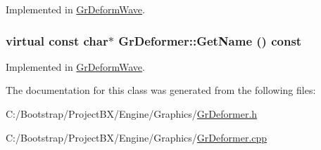 Implemented in \hyperlink{class_gr_deform_wave_8beb11978116306cb10394563b241eb9}{GrDeformWave}.\hypertarget{class_gr_deformer_c4b54b927f3b2febd0552bc610fe5b41}{
\subsubsection[{GetName}]{\setlength{\rightskip}{0pt plus 5cm}virtual const char$\ast$ GrDeformer::GetName () const}}
\label{class_gr_deformer_c4b54b927f3b2febd0552bc610fe5b41}




Implemented in \hyperlink{class_gr_deform_wave_ba87858cdf1442419942004c98691ee4}{GrDeformWave}.

The documentation for this class was generated from the following files:\begin{CompactItemize}
\item 
C:/Bootstrap/ProjectBX/Engine/Graphics/\hyperlink{_gr_deformer_8h}{GrDeformer.h}\item 
C:/Bootstrap/ProjectBX/Engine/Graphics/\hyperlink{_gr_deformer_8cpp}{GrDeformer.cpp}\end{CompactItemize}
